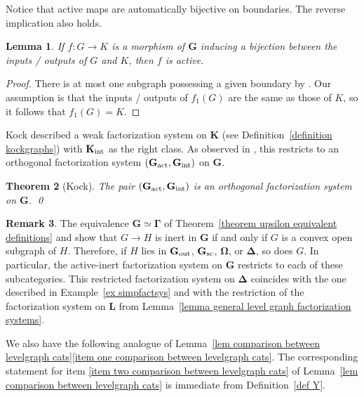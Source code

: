 \documentclass{amsart}
\newtheorem{theorem}{Theorem}
\numberwithin{theorem}{subsection}
\newtheorem{lemma}[theorem]{Lemma}
\theoremstyle{definition}
\newtheorem{remark}[theorem]{Remark}
\newcommand{\name}[1]{\ensuremath{\text{\textup{#1}}}}
\newcommand{\simp}{\mathbf{\Delta}}
\newcommand{\bbO}{\mathbf{\Omega}}
\newcommand{\levelg}{\mathbf{L}}
\newcommand{\bbY}{\mathbf{G}}
\newcommand{\bbYout}{\bbY_{\name{out}}}
\newcommand{\hryint}{\bbY_{\name{int}}}
\newcommand{\hryact}{\bbY_{\name{act}}}
\newcommand{\hryGamma}{\mathbf{\Gamma}}
\newcommand{\kockgraphs}{\mathbf{K}}
\newcommand{\kockint}{\kockgraphs_{\name{int}}}
\begin{document}
Notice that active maps are automatically bijective on boundaries.
The reverse implication also holds.

\begin{lemma}
If $f \colon G \to K$ is a morphism of $\bbY$ inducing a bijection between the inputs / outputs of $G$ and $K$, then $f$ is active.
\end{lemma}
\begin{proof}
There is at most one subgraph possessing a given boundary by \cite[Lemma 6.39]{hrybook}.
Our assumption is that the inputs / outputs of $f_1(G)$ are the same as those of $K$, so it follows that $f_1(G) = K$.
\end{proof}

Kock described a weak factorization system on $\kockgraphs$ (see Definition~\ref{definition kockgraphs}) with $\kockint$ as the right class.
As observed in \cite[2.4.14]{Kock_Properads}, this restricts to an orthogonal factorization system $(\hryact, \hryint)$ on $\bbY$.

\begin{theorem}[Kock]\label{theo Yfs}
The pair $(\hryact, \hryint)$ is an orthogonal factorization system on $\bbY$. \qed
\end{theorem}

\begin{remark}\label{rem inert=convex_open}
	The equivalence $\bbY \simeq \hryGamma$ of Theorem~\ref{theorem upsilon equivalent definitions} and \cite[2.4.14]{Kock_Properads} show that $G\to H$ is inert in $\bbY$ if and only if $G$ is a convex open subgraph of $H$.
	Therefore, if $H$ lies in $\bbYout$, $\bbY_{\name{sc}}$, $\bbO$, or $\simp$, so does $G$. 
	In particular, the active-inert factorization system on $\bbY$ restricts to each of these subcategories.
	This restricted factorization system on $\simp$ coincides with the one described in Example~\ref{ex simpfactsys} and with the restriction of the factorization system on $\levelg$ from Lemma~\ref{lemma general level graph factorization systems}.
\end{remark}

We also have the following analogue of Lemma~\ref{lem comparison between levelgraph cats}\eqref{item one comparison between levelgraph cats}. 
The corresponding statement for item \eqref{item two comparison between levelgraph cats} of Lemma~\ref{lem comparison between levelgraph cats} is immediate from Definition~\ref{def Y}.
\end{document}
